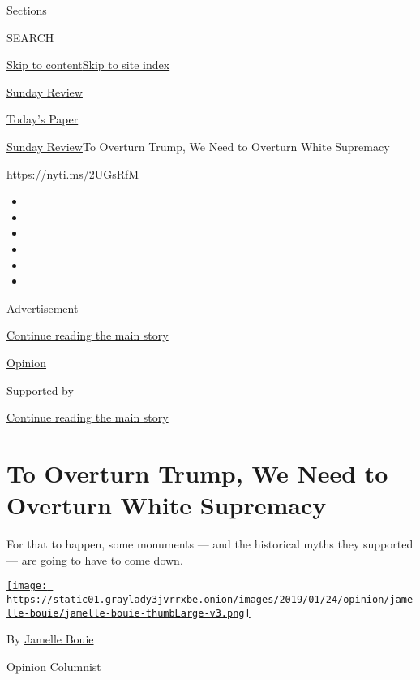 Sections

SEARCH

\protect\hyperlink{site-content}{Skip to
content}\protect\hyperlink{site-index}{Skip to site index}

\href{https://www.nytimes3xbfgragh.onion/section/opinion/sunday}{Sunday
Review}

\href{https://myaccount.nytimes3xbfgragh.onion/auth/login?response_type=cookie\&client_id=vi}{}

\href{https://www.nytimes3xbfgragh.onion/section/todayspaper}{Today's
Paper}

\href{/section/opinion/sunday}{Sunday Review}\textbar{}To Overturn
Trump, We Need to Overturn White Supremacy

\url{https://nyti.ms/2UGsRfM}

\begin{itemize}
\item
\item
\item
\item
\item
\item
\end{itemize}

Advertisement

\protect\hyperlink{after-top}{Continue reading the main story}

\href{/section/opinion}{Opinion}

Supported by

\protect\hyperlink{after-sponsor}{Continue reading the main story}

\hypertarget{to-overturn-trump-we-need-to-overturn-white-supremacy}{%
\section{To Overturn Trump, We Need to Overturn White
Supremacy}\label{to-overturn-trump-we-need-to-overturn-white-supremacy}}

For that to happen, some monuments --- and the historical myths they
supported --- are going to have to come down.

\href{https://www.nytimes3xbfgragh.onion/column/jamelle-bouie}{\texttt{[image: https://static01.graylady3jvrrxbe.onion/images/2019/01/24/opinion/jamelle-bouie/jamelle-bouie-thumbLarge-v3.png]}}

By
\href{https://www.nytimes3xbfgragh.onion/column/jamelle-bouie}{Jamelle
Bouie}

Opinion Columnist

